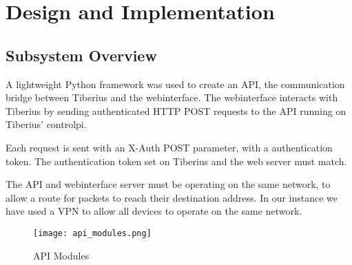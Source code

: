 \section{Design and Implementation}

\subsection{Subsystem Overview}
\label{sec:web_subsystem_overview}
A lightweight Python framework was used to create an API, the communication bridge between Tiberius and the \gls{webinterface}. The \gls{webinterface} interacts with Tiberius by sending authenticated \gls{HTTP} \gls{POST} requests to the \gls{API} running on Tiberius' \gls{controlpi}.

Each request is sent with an X-Auth \gls{POST} parameter, with a authentication token. The authentication token set on Tiberius and the web server must match.

The \gls{API} and \gls{webinterface} server must be operating on the same network, to allow a route for packets to reach their destination address. In our instance we have used a \gls{VPN} to allow all devices to operate on the same network.

\begin{figure}[!htb]
\begin{center}
\texttt{[image: api\_modules.png]}
\end{center}
\caption{API Modules}
\label{fig:api-modules}
\end{figure}

